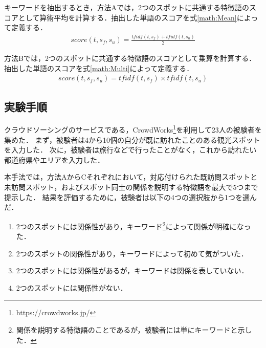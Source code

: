 \documentclass[submit]{ipsj}
\begin{document}

キーワードを抽出するとき，方法Aでは，2つのスポットに共通する特徴語のスコアとして算術平均を計算する．抽出した単語のスコアを式\ref{math:Mean}によって定義する．
\begin{eqnarray}
  score(t,s_f,s_u) = \frac{tfidf(t,s_f) + tfidf(t,s_u)}{2}
  \label{math:Mean}
\end{eqnarray}

方法Bでは，2つのスポットに共通する特徴語のスコアとして乗算を計算する．抽出した単語のスコアを式\ref{math:Multi}によって定義する．
\begin{eqnarray}
  score(t,s_f,s_u) = tfidf(t,s_f) \times tfidf(t,s_u)
  \label{math:Multi}
\end{eqnarray}


\subsection{実験手順}
\label{subsec:実験手順}
クラウドソーシングのサービスである，CrowdWorks\footnote{https://crowdworks.jp/}を利用して23人の被験者を集めた．
まず，被験者は4から10個の自分が既に訪れたことのある観光スポットを入力した．
次に，被験者は旅行などで行ったことがなく，これから訪れたい都道府県やエリアを入力した．

本手法では，方法AからCそれぞれにおいて，対応付けられた既訪問スポットと未訪問スポット，およびスポット同士の関係を説明する特徴語を最大で5つまで提示した．
結果を評価するために，被験者は以下の4つの選択肢から1つを選んだ．
\begin{enumerate}
  \item 2つのスポットには関係性があり，キーワード\footnote{関係を説明する特徴語のことであるが，被験者には単にキーワードと示した．}によって関係が明確になった．
  \item 2つのスポットの関係性があり，キーワードによって初めて気がついた．
  \item 2つのスポットには関係性があるが，キーワードは関係を表していない．
  \item 2つのスポットには関係性がない．
\end{enumerate}
\end{document}
